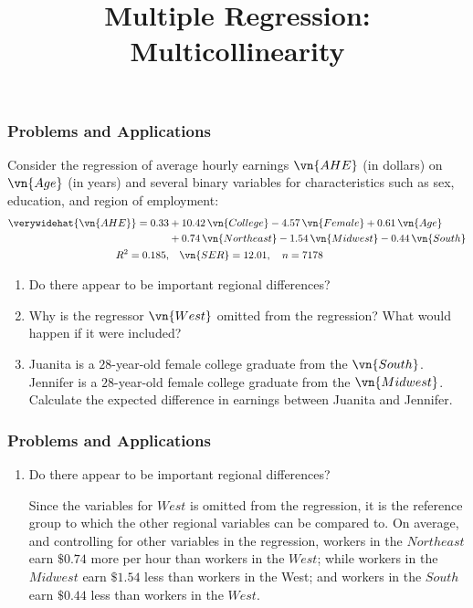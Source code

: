 \title[Multiple Regression]{Multiple Regression: Multicollinearity}
\date{}







\begin{frame}
\frametitle{Problems and Applications}
Consider the regression of average hourly earnings $\vn{AHE}$ (in dollars) on $\vn{Age}$ (in years) and several binary variables for characteristics such as sex, education, and region of employment:
\begin{align*}
\verywidehat{\vn{AHE}} 
  = 0.33 & + 10.42\,\vn{College} - 4.57\,\vn{Female} + 0.61\,\vn{Age}\\ 
         & + 0.74\,\vn{Northeast} - 1.54\,\vn{Midwest} - 0.44\,\vn{South}\\
  \quad R^2 = 0.185, &
  \quad \vn{SER} = 12.01, 
  \quad n = 7178
\end{align*}
\vspace*{-2ex}
\begin{enumerate}
\item Do there appear to be important regional differences?
\item Why is the regressor $\vn{West}$ omitted from the regression? What would happen if it were included?
\item Juanita is a $28$-year-old female college graduate from the $\vn{South}$. Jennifer is a $28$-year-old female college graduate from the $\vn{Midwest}$. Calculate the expected difference in earnings between Juanita and Jennifer.
\end{enumerate}
\end{frame}


\begin{frame}
\frametitle{Problems and Applications}

\begin{enumerate}\setcounter{enumi}{0}

\item Do there appear to be important regional differences?

\begin{answer}
Since the variables for $West$ is omitted from the regression, it is the reference group to which the other regional variables can be compared to. 
On average, and controlling for other variables in the regression, workers in the $Northeast$ earn $\$0.74$ more per hour than workers in the $West$; while workers in the $Midwest$ earn $\$1.54$ less than workers in the West; and workers in the $South$ earn $\$0.44$ less than workers in the $West$.
\end{answer}

\end{enumerate}
\end{frame}


